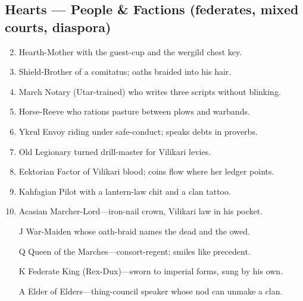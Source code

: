 \subsection*{Hearts --- People \& Factions (federates, mixed courts, diaspora)}
\label{sec:vilikari-people}
\begin{enumerate}
\setcounter{enumi}{1}
\item Hearth-Mother with the guest-cup and the wergild chest key.
\item Shield-Brother of a comitatus; oaths braided into his hair.
\item March Notary (Utar-trained) who writes three scripts without blinking.
\item Horse-Reeve who rations pasture between plows and warbands.
\item Ykrul Envoy riding under safe-conduct; speaks debts in proverbs.
\item Old Legionary turned drill-master for Vilikari levies.
\item Ecktorian Factor of Vilikari blood; coins flow where her ledger points.
\item Kahfagian Pilot with a lantern-law chit and a clan tattoo.
\item Acasian Marcher-Lord---iron-nail crown, Vilikari law in his pocket.
\item[J] War-Maiden whose oath-braid names the dead and the owed.
\item[Q] Queen of the Marches---consort-regent; smiles like precedent.
\item[K] Federate King (Rex-Dux)---sworn to imperial forms, sung by his own.
\item[A] Elder of Elders---thing-council speaker whose nod can unmake a clan.
\end{enumerate}

